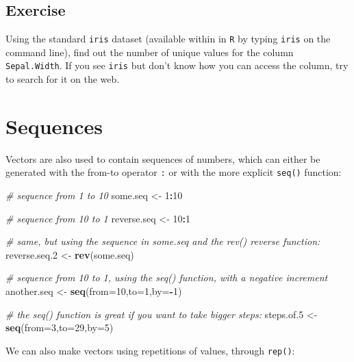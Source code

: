 \documentclass[
]{book}
\newenvironment{Shaded}{\begin{snugshade}}{\end{snugshade}}
\newcommand{\AttributeTok}[1]{\textcolor[rgb]{0.13,0.29,0.53}{#1}}
\newcommand{\CommentTok}[1]{\textcolor[rgb]{0.56,0.35,0.01}{\textit{#1}}}
\newcommand{\DecValTok}[1]{\textcolor[rgb]{0.00,0.00,0.81}{#1}}
\newcommand{\FunctionTok}[1]{\textcolor[rgb]{0.13,0.29,0.53}{\textbf{#1}}}
\newcommand{\NormalTok}[1]{#1}
\newcommand{\OtherTok}[1]{\textcolor[rgb]{0.56,0.35,0.01}{#1}}
\newcommand{\SpecialCharTok}[1]{\textcolor[rgb]{0.81,0.36,0.00}{\textbf{#1}}}
\begin{document}
\subsection{Exercise}\label{exercise}

Using the standard \texttt{iris} dataset (available within in \texttt{R} by typing \texttt{iris} on the command line), find out the number of unique values for the column \texttt{Sepal.Width}. If you see \texttt{iris} but don't know how you can access the column, try to search for it on the web.

\section{Sequences}\label{sequences}

Vectors are also used to contain sequences of numbers, which can either be generated with the from-to operator \texttt{:} or with the more explicit \texttt{seq()} function:

\begin{Shaded}
\begin{Highlighting}[]
\CommentTok{\# sequence from 1 to 10}
\NormalTok{some.seq }\OtherTok{\textless{}{-}} \DecValTok{1}\SpecialCharTok{:}\DecValTok{10}

\CommentTok{\# sequence from 10 to 1}
\NormalTok{reverse.seq }\OtherTok{\textless{}{-}} \DecValTok{10}\SpecialCharTok{:}\DecValTok{1}

\CommentTok{\# same, but using the sequence in some.seq and the rev() \textquotesingle{}reverse\textquotesingle{} function:}
\NormalTok{reverse.seq.2 }\OtherTok{\textless{}{-}} \FunctionTok{rev}\NormalTok{(some.seq)}

\CommentTok{\# sequence from 10 to 1, using the seq() function, with a negative increment}
\NormalTok{another.seq }\OtherTok{\textless{}{-}} \FunctionTok{seq}\NormalTok{(}\AttributeTok{from=}\DecValTok{10}\NormalTok{,}\AttributeTok{to=}\DecValTok{1}\NormalTok{,}\AttributeTok{by=}\SpecialCharTok{{-}}\DecValTok{1}\NormalTok{)}

\CommentTok{\# the seq() function is great if you want to take bigger steps:}
\NormalTok{steps.of.5 }\OtherTok{\textless{}{-}} \FunctionTok{seq}\NormalTok{(}\AttributeTok{from=}\DecValTok{3}\NormalTok{,}\AttributeTok{to=}\DecValTok{29}\NormalTok{,}\AttributeTok{by=}\DecValTok{5}\NormalTok{)}
\end{Highlighting}
\end{Shaded}

We can also make vectors using repetitions of values, through \texttt{rep()}:
\end{document}
